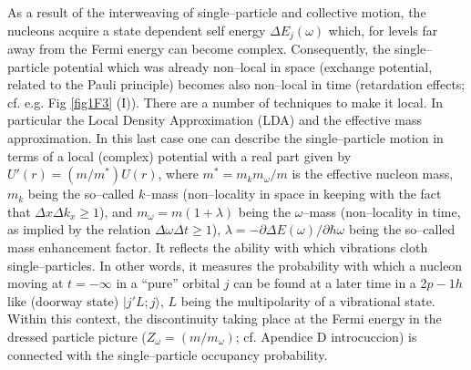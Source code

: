 As a result of the interweaving of single--particle and collective motion, the nucleons acquire a state dependent self energy $\Delta E_j(\omega)$ which, for levels far away from the Fermi energy can become complex. Consequently, the single--particle potential which was already non--local in space (exchange potential, related to the Pauli principle) becomes also non--local in time (retardation effects; cf. e.g. Fig \ref{fig1F3} (I)). There are a number of techniques to make it local. In particular the Local Density Approximation (LDA) and the effective mass approximation. In this last case one can describe the single--particle motion in terms of a local (complex) potential with a real part given by $U'(r)=(m/m^*)U(r)$, where $m^*=m_km_\omega/m$ is the effective nucleon mass, $m_k$ being the so--called $k$--mass (non--locality in space in keeping with the fact that $\Delta x\Delta k_x\geq1$), and $m_\omega=m(1+\lambda)$ being the $\omega$--mass (non--locality in time, as implied by the relation $\Delta \omega\Delta t\geq1$),  $\lambda=-\partial \Delta E(\omega)/\partial \hbar \omega$ being the so--called mass enhancement factor. It reflects the ability with which vibrations cloth single--particles. In other words, it measures the probability with which a nucleon moving at  $t=-\infty$ in a ``pure'' orbital $j$ can be found at a later time in a 2$p-1h$ like (doorway state) $|j'L;j\rangle$, $L$ being the multipolarity of a vibrational state. Within this context, the discontinuity taking place at the Fermi energy in the dressed particle picture ($Z_\omega=(m/m_\omega)$; cf. Apendice D introcuccion) is connected with the single--particle occupancy probability.


